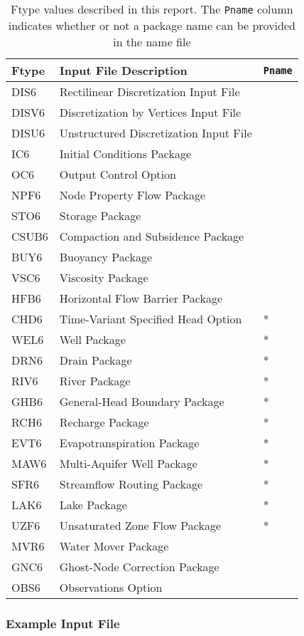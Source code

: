 \begin{table}[H]
\caption{Ftype values described in this report.  The \texttt{Pname} column indicates whether or not a package name can be provided in the name file}
\small
\begin{center}
\begin{tabular*}{\columnwidth}{l l l}
\hline
\hline
Ftype & Input File Description & \texttt{Pname}\\
\hline
DIS6 & Rectilinear Discretization Input File \\
DISV6 & Discretization by Vertices Input File \\
DISU6 & Unstructured Discretization Input File \\
IC6 & Initial Conditions Package \\
OC6 & Output Control Option \\
NPF6 & Node Property Flow Package \\ 
STO6 & Storage Package \\
CSUB6 & Compaction and Subsidence Package \\
BUY6 & Buoyancy Package \\
VSC6 & Viscosity Package \\
HFB6 & Horizontal Flow Barrier Package\\
CHD6 & Time-Variant Specified Head Option & * \\
WEL6 & Well Package & * \\
DRN6 & Drain Package & * \\
RIV6 & River Package & * \\
GHB6 & General-Head Boundary Package & * \\
RCH6 & Recharge Package & * \\
EVT6 & Evapotranspiration Package & * \\
MAW6 & Multi-Aquifer Well Package & * \\
SFR6 & Streamflow Routing Package & * \\
LAK6 & Lake Package & * \\
UZF6 & Unsaturated Zone Flow Package & * \\
MVR6 & Water Mover Package \\
GNC6 & Ghost-Node Correction Package \\
OBS6 & Observations Option \\
\hline 
\end{tabular*}
\label{table:ftype-gwf}
\end{center}
\normalsize
\end{table}

\vspace{5mm}
\subsubsection{Example Input File}


